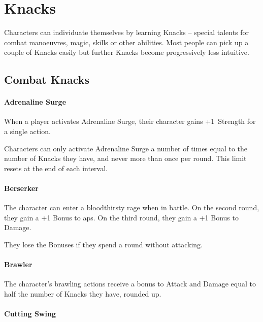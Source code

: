\chapter[Hall of Knacks]{Knacks}
\label{knacks}

\noindent
Characters can individuate themselves by learning Knacks -- special talents for combat manoeuvres, magic, skills or other abilities.
Most people can pick up a couple of Knacks easily but further Knacks become progressively less intuitive.

\section{Combat Knacks}

\begin{multicols}{2}

\subsubsection{Adrenaline Surge}
\label{adrenalinesurge}

When a player activates Adrenaline Surge, their character gains +1~Strength for a single action.

Characters can only activate Adrenaline Surge a number of times equal to the number of Knacks they have, and never more than once per round.
This limit resets at the end of each \gls{interval}.

\subsubsection{Berserker}

The character can enter a bloodthirsty rage when in battle.
On the second round, they gain a +1 Bonus to \glspl{ap}.
On the third round, they gain a +1 Bonus to Damage.

They lose the Bonuses if they spend a round without attacking.

\subsubsection{Brawler}

The character's brawling actions receive a bonus to Attack and Damage equal to half the number of Knacks they have, rounded up.

\subsubsection{Cutting Swing}


\end{multicols}
